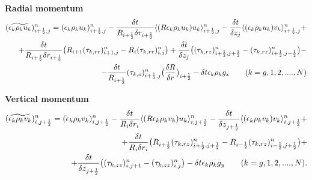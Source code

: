 {\bf Radial momentum}\\
%
\begin{eqnarray}
\htmlimage{}
(\widetilde{\epsilon_k \rho_k u_k})_{i+\frac{1}{2},j}^{n} =
(\epsilon_k \rho_k u_k)_{i+\frac{1}{2},j}^{n} - 
\frac{\delta t}{R_{i+\frac{1}{2}} \delta r_{i+\frac{1}{2}}} 
\langle (R \epsilon_k \rho_k u_k) u_k \rangle_{i+\frac{1}{2},j}^{n} - 
\frac{\delta t} {\delta z_j} 
\langle (\epsilon_k \rho_k u_k) v_k \rangle_{i+\frac{1}{2},j}^{n} + \nonumber \\
+ \frac{\delta t} {R_{i+\frac{1}{2}} \delta r_{i+\frac{1}{2}}} 
\big(R_{i+1}(\tau_{k,rr})_{i+1,j}^{n} - R_i (\tau_{k,rr})_{i,j}^{n} \big) + 
\frac{\delta t} {\delta z_j} 
\big( (\tau_{k,rz})_{i+\frac{1}{2},j+\frac{1}{2}}^{n} - 
(\tau_{k,rz})_{i+\frac{1}{2},j-\frac{1}{2}}^{n} \big) - \nonumber \\
- \frac{\delta t} {R_{i+\frac{1}{2}}}
(\tau_{k,o})_{i+\frac{1}{2},j}^{n} 
\big( \frac{\delta R}{\delta r} \big)_{i+\frac{1}{2}}
-\delta t \epsilon_k \rho_k g_x
\qquad (k=g,1,2, ....,N)
\nonumber
\end{eqnarray}

{\bf Vertical momentum}\\
%
\begin{eqnarray}
\htmlimage{}
(\widetilde{\epsilon_k \rho_k v_k})_{i,j+\frac{1}{2}}^{n} =
(\epsilon_k \rho_k v_k)_{i,j+\frac{1}{2}}^{n} -
\frac{\delta t}{R_{i} \delta r_{i}} 
\langle (R \epsilon_k \rho_k v_k) u_k \rangle_{i,j+\frac{1}{2}}^{n} -
\frac{\delta t} {\delta z_{j+\frac{1}{2}}} 
\langle (\epsilon_k \rho_k v_k) v_k \rangle_{i,j+\frac{1}{2}}^{n} + \nonumber \\
+ \frac{\delta t} {R_{i} \delta r_{i}} 
\big(R_{i+\frac{1}{2}}(\tau_{k,rz})_{i+\frac{1}{2},j+\frac{1}{2}}^{n} 
- R_{i-\frac{1}{2}} (\tau_{k,rz})_{i-\frac{1}{2},j+\frac{1}{2}}^{n} \big) + \nonumber \\
+ \frac{\delta t} {\delta z_{j+\frac{1}{2}}}
\big( (\tau_{k,zz})_{i,j+1}^{n} -
(\tau_{k,zz})_{i,j}^{n} \big)
- \delta t \epsilon_k \rho_k g_y
\qquad (k=g,1,2, ....,N).
\nonumber
\end{eqnarray}

